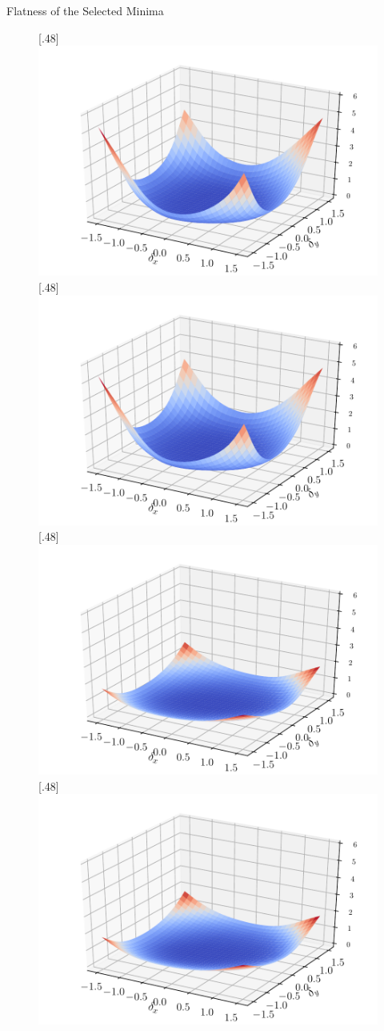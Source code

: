 \begin{frame}{Flatness of the Selected Minima}
\begin{figure}
[.48\textwidth]{\includegraphics[width=.28\textwidth]{figs/svhn_erm_train_loss_landscape3D.pdf}}
[.48\textwidth]{\includegraphics[width=.28\textwidth]{figs/svhn_erm_test_loss_landscape3D.pdf}}
[.48\textwidth]{\includegraphics[width=.28\textwidth]{figs/svhn_amp_train_loss_landscape3D.pdf}}
[.48\textwidth]{\includegraphics[width=.28\textwidth]{figs/svhn_amp_test_loss_landscape3D.pdf}}
\end{figure}
\end{frame}
